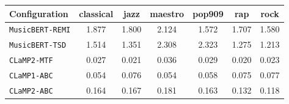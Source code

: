 \begin{tabular}{@{}lcccccc@{}}
\toprule
Configuration & classical & jazz & maestro & pop909 & rap & rock \\
\midrule
\texttt{MusicBERT-REMI} & 1.877 & 1.800 & 2.124 & 1.572 & 1.707 & 1.580 \\
\texttt{MusicBERT-TSD} & 1.514 & 1.351 & 2.308 & 2.323 & 1.275 & 1.213 \\
\texttt{CLaMP2-MTF} & 0.027 & 0.021 & 0.036 & 0.029 & 0.020 & 0.023 \\
\texttt{CLaMP1-ABC} & 0.054 & 0.076 & 0.054 & 0.058 & 0.075 & 0.077 \\
\texttt{CLaMP2-ABC} & 0.164 & 0.167 & 0.181 & 0.163 & 0.132 & 0.118 \\
\bottomrule
\end{tabular}